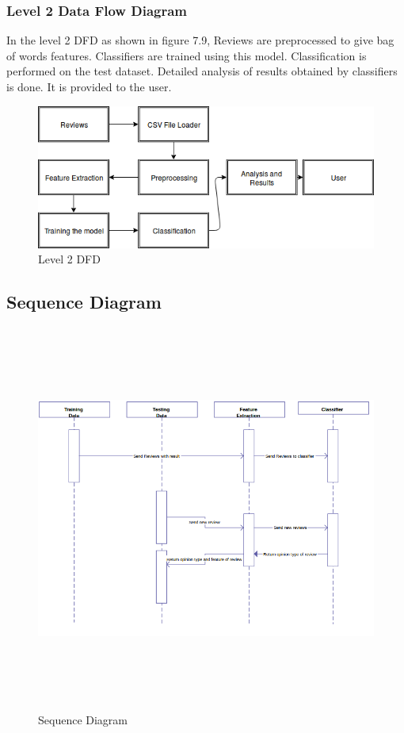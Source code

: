 \documentclass[oneside,a4paper,12pt]{pictreport}
\begin{document}
\subsubsection{Level 2 Data Flow Diagram}
In the level 2 DFD as shown in figure 7.9, Reviews are preprocessed to give bag of words features. Classifiers are trained using this model. Classification is 
performed on the test dataset. Detailed analysis of results obtained by classifiers is done. It is provided to the user.\\
\begin{figure}[h!]
\includegraphics[width=4.5in]{level_2.png}
\caption{Level 2 DFD}
\end{figure}

\subsection{Sequence Diagram}
\begin{figure}[h!]
\includegraphics[width=5.0in,height=5.0in]{sequence.png}
\caption{Sequence Diagram}
\end{figure}
\end{document}
